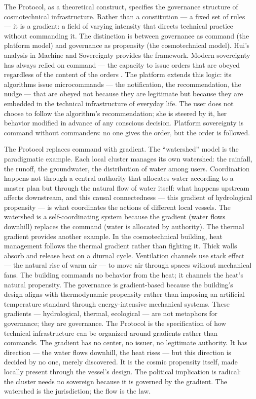 The   Protocol, as a theoretical construct, specifies the governance structure of cosmotechnical infrastructure. Rather than a constitution — a fixed set of rules — it is a gradient: a field of varying intensity that directs technical practice without commanding it. The distinction is between governance as command (the platform model) and governance as propensity (the cosmotechnical model). Hui’s analysis in Machine and Sovereignty provides the framework. Modern sovereignty has always relied on command — the capacity to issue orders that are obeyed regardless of the content of the orders \cite{hui_2024}. The platform extends this logic: its algorithms issue microcommands — the notification, the recommendation, the nudge — that are obeyed not because they are legitimate but because they are embedded in the technical infrastructure of everyday life. The user does not choose to follow the algorithm’s recommendation; she is steered by it, her behavior modified in advance of any conscious decision. Platform sovereignty is command without commanders: no one gives the order, but the order is followed.

The  Protocol replaces command with gradient. The “watershed” model is the paradigmatic example. Each local  cluster manages its own watershed: the rainfall, the runoff, the groundwater, the distribution of water among users. Coordination happens not through a central authority that allocates water according to a master plan but through the natural flow of water itself: what happens upstream affects downstream, and this causal connectedness — this gradient of hydrological propensity — is what coordinates the actions of different local vessels. The watershed is a self-coordinating system because the gradient (water flows downhill) replaces the command (water is allocated by authority). The thermal gradient provides another example. In the cosmotechnical building, heat management follows the thermal gradient rather than fighting it. Thick walls absorb and release heat on a diurnal cycle. Ventilation channels use stack effect — the natural rise of warm air — to move air through spaces without mechanical fans. The building commands no behavior from the heat; it channels the heat’s natural propensity. The governance is gradient-based because the building’s design aligns with thermodynamic propensity rather than imposing an artificial temperature standard through energy-intensive mechanical systems. These gradients — hydrological, thermal, ecological — are not metaphors for governance; they are governance. The   Protocol is the specification of how technical infrastructure can be organized around gradients rather than commands. The gradient has no center, no issuer, no legitimate authority. It has direction — the water flows downhill, the heat rises — but this direction is decided by no one, merely discovered. It is the cosmic propensity itself, made locally present through the vessel’s design. The political implication is radical: the  cluster needs no sovereign because it is governed by the gradient. The watershed is the jurisdiction; the flow is the law.

